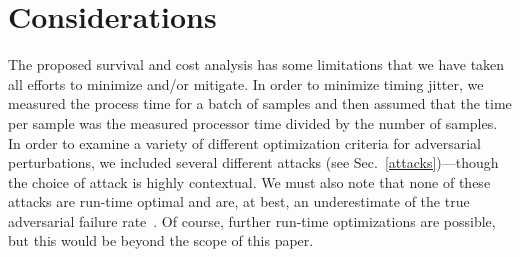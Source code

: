 \section{Considerations}
The proposed survival and cost analysis  has some limitations that we have taken all efforts to minimize and/or mitigate. In order to minimize timing jitter, we measured the process time for a batch of samples and then assumed that the time per sample was the measured processor time divided by the number of samples. In order to examine a variety of different optimization criteria for adversarial perturbations, we included several different attacks (see Sec.~\ref{attacks})---though the choice of attack is highly contextual. We must also note that none of these attacks are run-time optimal and are, at best, an underestimate of the true adversarial failure rate~\citep{meyers}. Of course, further run-time optimizations are possible, but this would be beyond the scope of this paper. 

